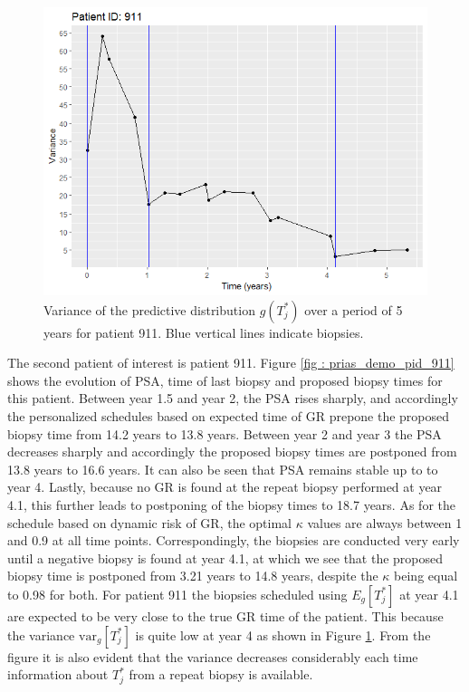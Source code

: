 \begin{figure}
\centerline{\includegraphics[width=\columnwidth]{images/variance/variance_pred_dist_911.png}}
\caption{Variance of the predictive distribution $g(T^*_j)$ over a period of 5 years for patient 911. Blue vertical lines indicate biopsies.}
\label{fig : variance_pred_dist_911}
\end{figure}

The second patient of interest is patient 911. Figure \ref{fig : prias_demo_pid_911} shows the evolution of PSA, time of last biopsy and proposed biopsy times for this patient. Between year 1.5 and year 2, the PSA rises sharply, and accordingly the personalized schedules based on expected time of GR prepone the proposed biopsy time from 14.2 years to 13.8 years. Between year 2 and year 3 the PSA decreases sharply and accordingly the proposed biopsy times are postponed from 13.8 years to 16.6 years. It can also be seen that PSA remains stable up to to year 4. Lastly, because no GR is found at the repeat biopsy performed at year 4.1, this further leads to postponing of the biopsy times to 18.7 years. As for the schedule based on dynamic risk of GR, the optimal $\kappa$ values are always between 1 and 0.9 at all time points. Correspondingly, the biopsies are conducted very early until a negative biopsy is found at year 4.1, at which we see that the proposed biopsy time is postponed from 3.21 years to 14.8 years, despite the $\kappa$ being equal to 0.98 for both. For patient 911 the biopsies scheduled using $E_g[T^*_j]$ at year 4.1 are expected to be very close to the true GR time of the patient. This because the variance $\mbox{var}_g[T^*_j]$ is quite low at year 4 as shown in Figure \ref{fig : variance_pred_dist_911}. From the figure it is also evident that the variance decreases considerably each time information about $T^*_j$ from a repeat biopsy is available.

